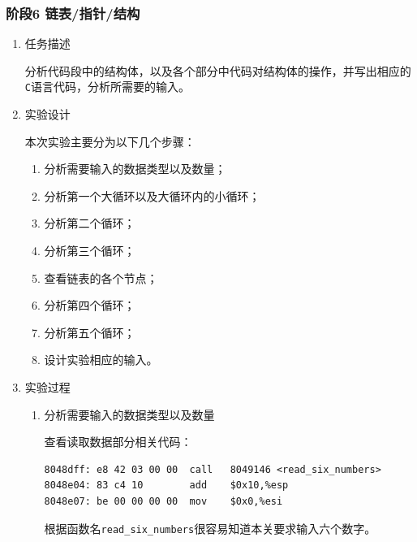 \documentclass{paper}
\begin{document}
\subsubsection{阶段6 链表/指针/结构}
\begin{enumerate}
\item 任务描述

分析代码段中的结构体，以及各个部分中代码对结构体的操作，并写出相应的\verb|C|语言代码，分析所需要的输入。

\item 实验设计

本次实验主要分为以下几个步骤：
\begin{enumerate}
\item 分析需要输入的数据类型以及数量；
\item 分析第一个大循环以及大循环内的小循环；
\item 分析第二个循环；
\item 分析第三个循环；
\item 查看链表的各个节点；
\item 分析第四个循环；
\item 分析第五个循环；
\item 设计实验相应的输入。
\end{enumerate}

\item 实验过程

\begin{enumerate}
\item 分析需要输入的数据类型以及数量

查看读取数据部分相关代码：
\begin{lstlisting}
8048dff: e8 42 03 00 00  call   8049146 <read_six_numbers>
8048e04: 83 c4 10        add    $0x10,%esp
8048e07: be 00 00 00 00  mov    $0x0,%esi
\end{lstlisting}
根据函数名\verb|read_six_numbers|很容易知道本关要求输入六个数字。


\end{enumerate}
\end{enumerate}
\end{document}
